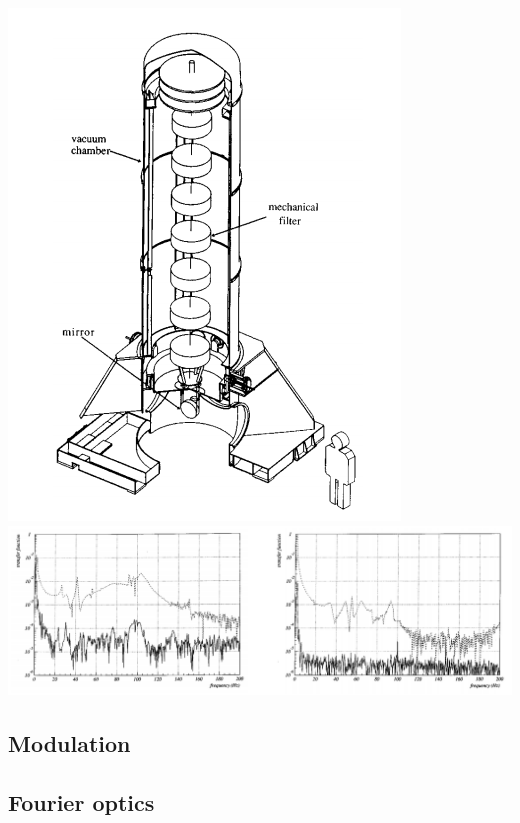 \begin{center}
  \includegraphics[width=.2\linewidth]{imgs/fourier/virgo_mechanical_filter.png}
  \includegraphics[width=.75\linewidth]{imgs/fourier/virgo_mechanical_filter_response.png}
\end{center}


\subsection{Modulation}
\label{sec:modulation}

\subsection{Fourier optics}
\label{sec:}